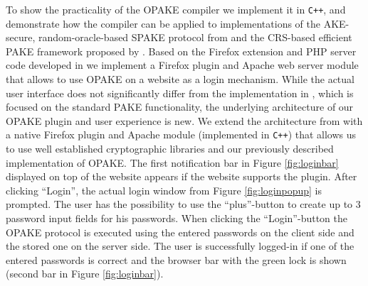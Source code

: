 \noindent{}

\noindent
To show the practicality of the \ac{OPAKE} compiler we implement it in \verb/C++/, and demonstrate how the compiler can be applied to implementations of the \ac{AKE}-secure, random-oracle-based SPAKE protocol from \cite{Abdalla2005} and the \ac{CRS}-based efficient \ac{PAKE} framework proposed by \citeauthor{Gennaro2008} \cite{Gennaro2008}.
Based on the Firefox extension and PHP server code developed in \cite{MSD13} we implement a Firefox plugin and Apache web server module that allows to use \ac{OPAKE} on a website as a login mechanism.
While the actual user interface does not significantly differ from the implementation in \cite{MSD13}, which is focused on the standard PAKE functionality, the underlying architecture of our \ac{OPAKE} plugin and user experience is new.
We extend the architecture from \cite{MSD13} with a native Firefox plugin and Apache module (implemented in \texttt{C++}) that allows us to use well established cryptographic libraries and our previously described implementation of \ac{OPAKE}.
The first notification bar in Figure \ref{fig:loginbar} displayed on top of the website appears if the website supports the plugin.
After clicking ``Login'', the actual login window from Figure \ref{fig:loginpopup} is prompted.
The user has the possibility to use the ``plus''-button to create up to $3$ password input fields for his passwords.
When clicking the ``Login''-button the \ac{OPAKE} protocol is executed using the entered passwords on the client side and the stored one on the server side.
The user is successfully logged-in if one of the entered passwords is correct and the browser bar with the green lock is shown (second bar in Figure \ref{fig:loginbar}).

